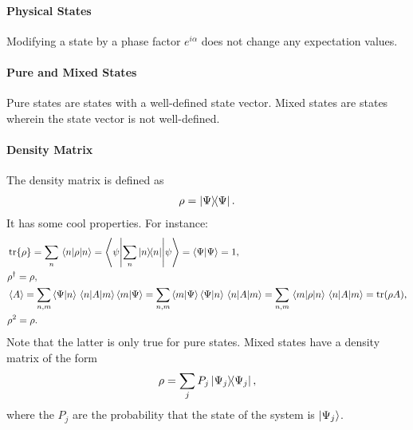 \paragraph{Physical States}
Modifying a state by a phase factor $e^{i\alpha}$ does not change any expectation values.

\paragraph{Pure and Mixed States}
Pure states are states with a well-defined state vector. Mixed states are states wherein the state vector is not well-defined.

\paragraph{Density Matrix}
The density matrix is defined as
\begin{align*}
	\rho = \op{\Psi}{\Psi}.
\end{align*}
It has some cool properties. For instance:
\begin{align*}
	&\tr{\rho} = \sum\limits_{n}\expval{\rho}{n} = \ev**{\sum\limits_{n}\op{n}{n}}{\psi} = \braket{\Psi} = 1, \\
	&\adj{\rho} = \rho, \\
	&\expval{A} = \sum\limits_{n, m}\braket{\Psi}{n}\mel{n}{A}{m}\braket{m}{\Psi} = \sum\limits_{n, m}\braket{m}{\Psi}\braket{\Psi}{n}\mel{n}{A}{m} = \sum\limits_{n, m}\mel{m}{\rho}{n}\mel{n}{A}{m} = \tr(\rho A), \\
	&\rho^{2} = \rho.
\end{align*}
Note that the latter is only true for pure states. Mixed states have a density matrix of the form
\begin{align*}
	\rho = \sum\limits_{j}P_{j}\op{\Psi_{j}}{\Psi_{j}},
\end{align*}
where the $P_{j}$ are the probability that the state of the system is $\ket{\Psi_{j}}$.

